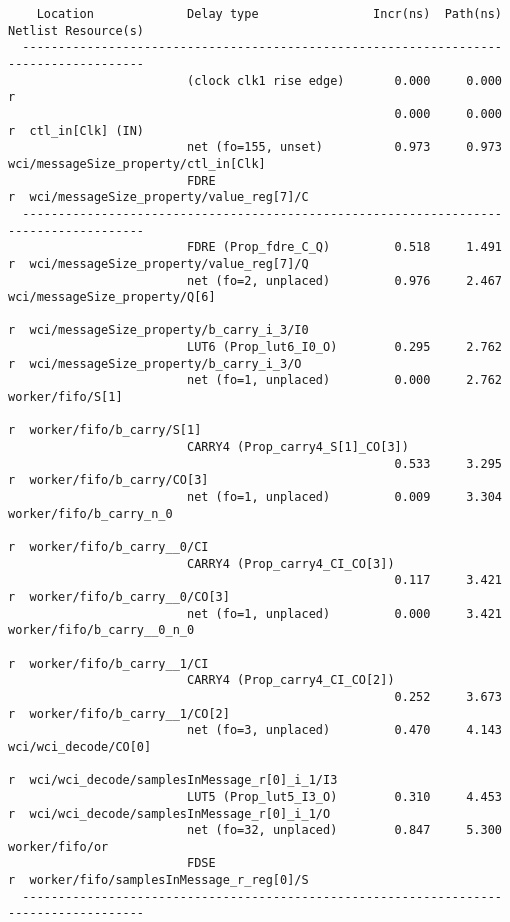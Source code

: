 \documentclass{article}
\begin{document}
\begin{lstlisting}
    Location             Delay type                Incr(ns)  Path(ns)    Netlist Resource(s)
  -------------------------------------------------------------------    -------------------
                         (clock clk1 rise edge)       0.000     0.000 r
                                                      0.000     0.000 r  ctl_in[Clk] (IN)
                         net (fo=155, unset)          0.973     0.973    wci/messageSize_property/ctl_in[Clk]
                         FDRE                                         r  wci/messageSize_property/value_reg[7]/C
  -------------------------------------------------------------------    -------------------
                         FDRE (Prop_fdre_C_Q)         0.518     1.491 r  wci/messageSize_property/value_reg[7]/Q
                         net (fo=2, unplaced)         0.976     2.467    wci/messageSize_property/Q[6]
                                                                      r  wci/messageSize_property/b_carry_i_3/I0
                         LUT6 (Prop_lut6_I0_O)        0.295     2.762 r  wci/messageSize_property/b_carry_i_3/O
                         net (fo=1, unplaced)         0.000     2.762    worker/fifo/S[1]
                                                                      r  worker/fifo/b_carry/S[1]
                         CARRY4 (Prop_carry4_S[1]_CO[3])
                                                      0.533     3.295 r  worker/fifo/b_carry/CO[3]
                         net (fo=1, unplaced)         0.009     3.304    worker/fifo/b_carry_n_0
                                                                      r  worker/fifo/b_carry__0/CI
                         CARRY4 (Prop_carry4_CI_CO[3])
                                                      0.117     3.421 r  worker/fifo/b_carry__0/CO[3]
                         net (fo=1, unplaced)         0.000     3.421    worker/fifo/b_carry__0_n_0
                                                                      r  worker/fifo/b_carry__1/CI
                         CARRY4 (Prop_carry4_CI_CO[2])
                                                      0.252     3.673 r  worker/fifo/b_carry__1/CO[2]
                         net (fo=3, unplaced)         0.470     4.143    wci/wci_decode/CO[0]
                                                                      r  wci/wci_decode/samplesInMessage_r[0]_i_1/I3
                         LUT5 (Prop_lut5_I3_O)        0.310     4.453 r  wci/wci_decode/samplesInMessage_r[0]_i_1/O
                         net (fo=32, unplaced)        0.847     5.300    worker/fifo/or
                         FDSE                                         r  worker/fifo/samplesInMessage_r_reg[0]/S
  -------------------------------------------------------------------    -------------------


\end{lstlisting}
\end{document}
